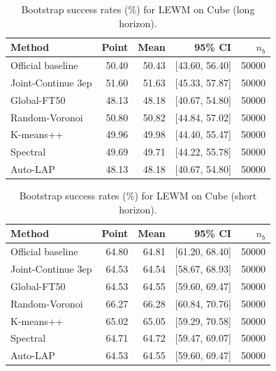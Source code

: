 \begin{table}[t]
\centering
\small
\caption{Bootstrap success rates (\%) for LEWM on Cube (long horizon).}
\begin{tabular}{lrrrr}
\toprule
Method & Point & Mean & 95\% CI & $n_b$ \\
\midrule
Official baseline & 50.40 & 50.43 & [43.60, 56.40] & 50000 \\
Joint-Continue 3ep & 51.60 & 51.63 & [45.33, 57.87] & 50000 \\
Global-FT50 & 48.13 & 48.18 & [40.67, 54.80] & 50000 \\
Random-Voronoi & 50.80 & 50.82 & [44.84, 57.02] & 50000 \\
K-means++ & 49.96 & 49.98 & [44.40, 55.47] & 50000 \\
Spectral & 49.69 & 49.71 & [44.22, 55.78] & 50000 \\
Auto-LAP & 48.13 & 48.18 & [40.67, 54.80] & 50000 \\
\bottomrule
\end{tabular}
\end{table}

\begin{table}[t]
\centering
\small
\caption{Bootstrap success rates (\%) for LEWM on Cube (short horizon).}
\begin{tabular}{lrrrr}
\toprule
Method & Point & Mean & 95\% CI & $n_b$ \\
\midrule
Official baseline & 64.80 & 64.81 & [61.20, 68.40] & 50000 \\
Joint-Continue 3ep & 64.53 & 64.54 & [58.67, 68.93] & 50000 \\
Global-FT50 & 64.53 & 64.55 & [59.60, 69.47] & 50000 \\
Random-Voronoi & 66.27 & 66.28 & [60.84, 70.76] & 50000 \\
K-means++ & 65.02 & 65.05 & [59.29, 70.58] & 50000 \\
Spectral & 64.71 & 64.72 & [59.47, 69.07] & 50000 \\
Auto-LAP & 64.53 & 64.55 & [59.60, 69.47] & 50000 \\
\bottomrule
\end{tabular}
\end{table}

